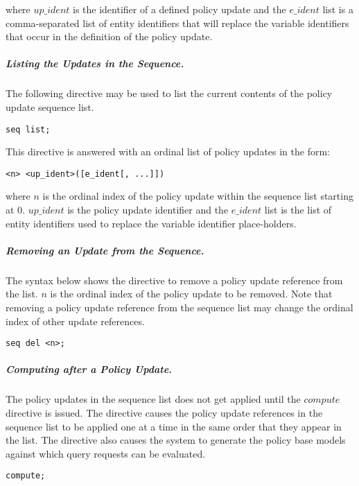 \documentclass[10pt, twocolumn]{article}
\begin{document}
          \noindent where $up\_ident$ is the identifier of a defined policy
          update and the $e\_ident$ list is a comma-separated list of entity
          identifiers that will replace the variable identifiers that occur in
          the definition of the policy update. 

        \subparagraph{Listing the Updates in the Sequence.}
          The following directive may be used to list the current contents of
          the policy update sequence list.

          \begin{verbatim}seq list;\end{verbatim}

          This directive is answered with an ordinal list of policy updates in
          the form:

          \begin{verbatim}<n> <up_ident>([e_ident[, ...]])\end{verbatim}

          \noindent where $n$ is the ordinal index of the policy update within
          the sequence list starting at 0. $up\_ident$ is the policy update
          identifier and the $e\_ident$ list is the list of entity identifiers
          used to replace the variable identifier place-holders.

        \subparagraph{Removing an Update from the Sequence.}
          The syntax below shows the directive to remove a policy update
          reference from the list. $n$ is the ordinal index of the policy
          update to be removed. Note that removing a policy update reference
          from the sequence list may change the ordinal index of other update
          references.

          \begin{verbatim}seq del <n>;\end{verbatim}

        \subparagraph{Computing after a Policy Update.}

          The policy updates in the sequence list does not get applied until
          the $compute$ directive is issued. The directive causes the policy
          update references in the sequence list to be applied one at a time in
          the same order that they appear in the list. The directive also
          causes the system to generate the policy base models against which
          query requests can be evaluated.

          \begin{verbatim}compute;\end{verbatim}
\end{document}
